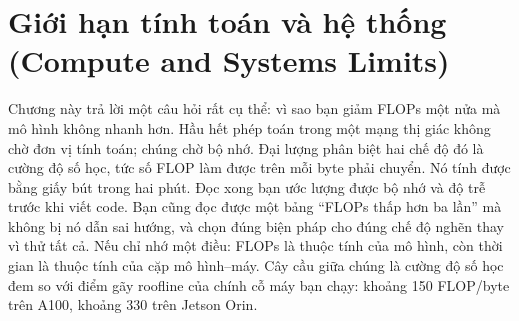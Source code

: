 \documentclass[../../deep_learning.tex]{subfiles}
\begin{document}
\chapter{Giới hạn tính toán và hệ thống (Compute and Systems Limits)}

\begin{tomtat}
Chương này trả lời một câu hỏi rất cụ thể: vì sao bạn giảm FLOPs một nửa mà mô hình không nhanh hơn. Hầu hết phép toán trong một mạng thị giác không chờ đơn vị tính toán; chúng chờ bộ nhớ. Đại lượng phân biệt hai chế độ đó là cường độ số học, tức số FLOP làm được trên mỗi byte phải chuyển. Nó tính được bằng giấy bút trong hai phút. Đọc xong bạn ước lượng được bộ nhớ và độ trễ trước khi viết code. Bạn cũng đọc được một bảng ``FLOPs thấp hơn ba lần'' mà không bị nó dẫn sai hướng, và chọn đúng biện pháp cho đúng chế độ nghẽn thay vì thử tất cả. Nếu chỉ nhớ một điều: FLOPs là thuộc tính của mô hình, còn thời gian là thuộc tính của cặp mô hình--máy. Cây cầu giữa chúng là cường độ số học đem so với điểm gãy roofline của chính cỗ máy bạn chạy: khoảng 150 FLOP/byte trên A100, khoảng 330 trên Jetson Orin.
\end{tomtat}
\end{document}
